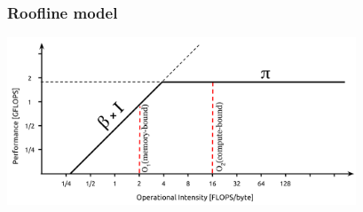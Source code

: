\begin{frame}[containsverbatim]
\frametitle{Roofline model}
\begin{center}
        {\includegraphics[height=5cm]{Day0/images/roofline.png}}
\end{center}
\end{frame}



